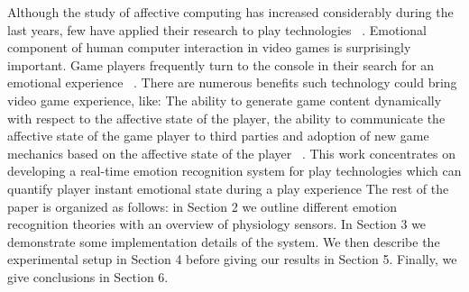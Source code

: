 Although the study of affective computing has increased
considerably during the last years, few have applied their
research to play technologies ~\cite{sykes2003affective}. Emotional component of
human computer interaction in video games is surprisingly
important. Game players frequently turn to the console in
their search for an emotional experience ~\cite{rouse2010game}. There are
numerous benefits such technology could bring video game
experience, like: The ability to generate game content dynamically 
with respect to the affective state of the player,
the ability to communicate the affective state of the game
player to third parties and adoption of new game mechanics
based on the affective state of the player ~\cite{sykes2003affective}.
This work concentrates on developing a real-time emotion
recognition system for play technologies which can quantify
player instant emotional state during a play experience The
rest of the paper is organized as follows: in Section 2 we outline 
different emotion recognition theories with an overview
of physiology sensors. In Section 3 we demonstrate some
implementation details of the system. We then describe the
experimental setup in Section 4 before giving our results in
Section 5. Finally, we give conclusions in Section 6.
